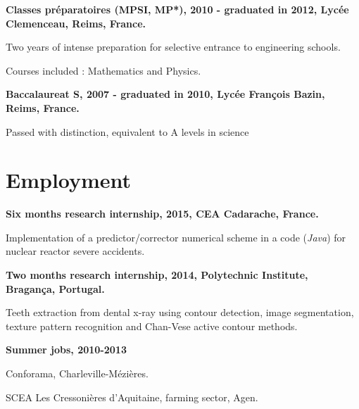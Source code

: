 \documentclass{article}
\renewenvironment{itemize}{
  \begin{list}{}{
      \setlength{\leftmargin}{1.5em}
      \setlength{\itemsep}{0.25em}
      \setlength{\parskip}{0pt}
      \setlength{\parsep}{0.25em}
    }
}{
  \end{list}
}
\begin{document}
\begin{itemize}
\begin{itemize}
		\end{itemize}
	\item \textbf{Classes préparatoires (MPSI, MP*), 2010 - graduated in 2012, Lycée Clemenceau, Reims, France.}
		\begin{itemize}
			\item Two years of intense preparation for selective entrance to engineering schools.
			\item Courses included : Mathematics and Physics.
		\end{itemize}
	\item \textbf{Baccalaureat S, 2007 - graduated in 2010, Lycée François Bazin, Reims, France.}
		\begin{itemize}
			\item Passed with distinction, equivalent to A levels in science
		\end{itemize}
\end{itemize}

\section*{Employment}
\begin{itemize}
	\item \textbf{Six months research internship, 2015, CEA Cadarache, France.}
		\begin{itemize}
			\item Implementation of a predictor/corrector numerical scheme in a code (\textit{Java}) for nuclear reactor severe accidents.
		\end{itemize}
	\item \textbf{Two months research internship, 2014, Polytechnic Institute, Bragança, Portugal.}
		\begin{itemize}
			\item Teeth extraction from dental x-ray using contour detection, image segmentation, texture pattern recognition and Chan-Vese active contour methods.
		\end{itemize}
	\item \textbf{Summer jobs, 2010-2013}
		\begin{itemize}
			\item Conforama, Charleville-Mézières.
			\item SCEA Les Cressonières d'Aquitaine, farming sector, Agen.
		\end{itemize}
\end{itemize}  

\end{document}
